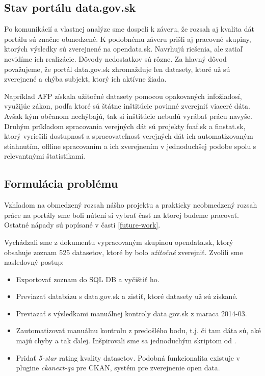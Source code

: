 \documentclass[12pt,a4paper]{article}
\begin{document}
\subsection{Stav portálu data.gov.sk} 
Po komunikácií a vlastnej analýze sme dospeli k záveru, že rozsah aj kvalita dát portálu sú značne obmedzené. K podobnému záveru prišli aj pracovné skupiny, ktorých výsledky sú zverejnené na opendata.sk. Navrhujú riešenia, ale zatiaľ nevidíme ich realizácie. Dôvody nedostatkov sú rôzne. Za hlavný dôvod považujeme, že portál data.gov.sk zhromažďuje len datasety, ktoré už sú zverejnené a chýba subjekt, ktorý ich aktívne žiada. 

Napríklad AFP získala užitočné datasety pomocou opakovaných infožiadosí, využijúc zákon, podľa ktoré sú štátne inštitúcie povinné zverejniť viaceré dáta. Avšak kým občanom nechýbajú, tak si inštitúcie nebudú vyrábať prácu navyše. Druhým príkladom spracovania verejných dát sú projekty foaf.sk a finstat.sk, ktorý vyriešili dostupnosť a spracovateľnosť verejných dát ich automatizovaným stiahnutím, offline spracovaním a ich zverejnením v jednoduchšej podobe spolu s relevantnými štatistikami. 

\subsection{Formulácia problému} 
\label{problem-statement}

Vzhľadom na obmedzený rozsah nášho projektu a prakticky neobmedzený rozsah práce na portály sme boli nútení si vybrať časť na ktorej budeme pracovať. Ostatné nápady sú popísané v časti \ref{future-work}. 

Vychádzali sme z dokumentu \cite{525} vypracovaným skupinou opendata.sk, ktorý obsahuje zoznam 525 datasetov, ktoré by bolo \emph{užitočné} zverejniť. Zvolili sme nasledovný postup:  
\begin{itemize} 
\item Exportovať zoznam do SQL DB a vyčištiť ho. 
\item Previazať databázu s data.gov.sk a zistiť, ktoré datasety už sú získané. 
\item Previazať s výsledkami manuálnej kontroly data.gov.sk z maraca 2014-03. 
\item Zautomatizovať manuálnu kontrolu z predošlého bodu, t.j. či tam dáta sú, aké majú chyby a tak ďalej. Inšpirovali sme sa jednoduchým skriptom od \cite{hany}. 
\item Pridať \emph{5-star} rating kvality datasetov. Podobná funkcionalita existuje v plugine \emph{ckanext-qa} pre CKAN, systém pre zverejnenie open data.  
\end{itemize} 
\end{document}
